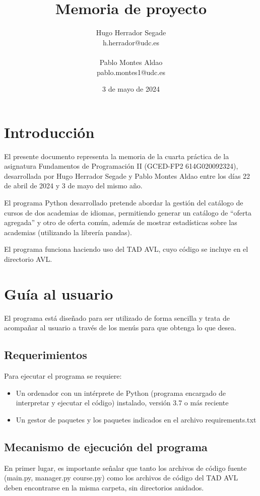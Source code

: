 \documentclass[a4paper]{article}
\title{Memoria de proyecto}
\author{
    \begin{minipage}{0.5\textwidth}
    \centering
    Hugo Herrador Segade\\
    \small h.herrador@udc.es\\
    \end{minipage}
    \begin{minipage}{0.5\textwidth}
    \centering
    Pablo Montes Aldao\\
    \small pablo.montes1@udc.es\\
    \end{minipage}
}
\date{3 de mayo de 2024}
\begin{document}
\maketitle


\section{Introducción}
El presente documento representa la memoria de la cuarta práctica de la asignatura Fundamentos de Programación II (GCED-FP2 614G020092324), desarrollada por Hugo Herrador Segade y Pablo Montes Aldao entre los días 22 de abril de 2024 y 3 de mayo del mismo año.

El programa Python desarrollado pretende abordar la gestión del catálogo de cursos de dos academias de idiomas, permitiendo generar un catálogo de ``oferta agregada'' y otro de oferta común, además de mostrar estadísticas sobre las academias (utilizando la librería pandas).

El programa funciona haciendo uso del TAD AVL, cuyo código se incluye en el directorio AVL.

\section{Guía al usuario}

El programa está diseñado para ser utilizado de forma sencilla y trata de acompañar al usuario a través de los menús para que obtenga lo que desea.

\subsection{Requerimientos}

Para ejecutar el programa se requiere:

\begin{itemize}

\item{Un ordenador con un intérprete de Python (programa encargado de interpretar y ejecutar el código) instalado, versión 3.7 o más reciente}

\item{Un gestor de paquetes y los paquetes indicados en el archivo requirements.txt}

\end{itemize}

\subsection{Mecanismo de ejecución del programa}
En primer lugar, es importante señalar que tanto los archivos de código fuente (main.py, manager.py course.py) como los archivos de código del TAD AVL deben encontrarse en la misma carpeta, sin directorios anidados. 
\end{document}
